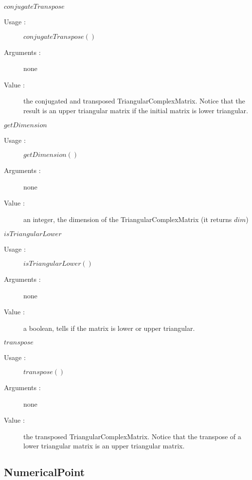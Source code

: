 \begin{description}
  \item $conjugateTranspose$
    \begin{description}
    \item[Usage :] $conjugateTranspose()$
    \item[Arguments :] none
    \item[Value :] the conjugated and transposed TriangularComplexMatrix. Notice that the result is an upper triangular matrix if the initial matrix is lower triangular.
    \end{description}
    \bigskip


  \item $getDimension$
    \begin{description}
    \item[Usage :] $getDimension()$
    \item[Arguments :] none
    \item[Value :] an integer, the dimension of the TriangularComplexMatrix (it returns $dim$)
    \end{description}
    \bigskip

  \item $isTriangularLower$
    \begin{description}
    \item[Usage :] $isTriangularLower()$
    \item[Arguments :] none
    \item[Value :] a boolean, tells if the matrix is lower or upper triangular.
    \end{description}
    \bigskip

  \item $transpose$
    \begin{description}
    \item[Usage :] $transpose()$
    \item[Arguments :] none
    \item[Value :] the transposed TriangularComplexMatrix. Notice that the transpose of a lower triangular matrix is an upper triangular matrix.
    \end{description}
    \bigskip

\end{description}



\newpage
\subsection{NumericalPoint}

